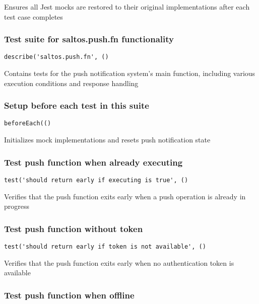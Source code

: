 \documentclass[a4paper]{article}
\begin{document}
Ensures all Jest mocks are restored to their original implementations
after each test case completes

\hypertarget{toc681}{}
\subsubsection{Test suite for saltos.push.fn functionality}

\begin{lstlisting}
describe('saltos.push.fn', ()
\end{lstlisting}

Contains tests for the push notification system's main function,
including various execution conditions and response handling

\hypertarget{toc682}{}
\subsubsection{Setup before each test in this suite}

\begin{lstlisting}
beforeEach(()
\end{lstlisting}

Initializes mock implementations and resets push notification state

\hypertarget{toc683}{}
\subsubsection{Test push function when already executing}

\begin{lstlisting}
test('should return early if executing is true', ()
\end{lstlisting}

Verifies that the push function exits early when a push operation
is already in progress

\hypertarget{toc684}{}
\subsubsection{Test push function without token}

\begin{lstlisting}
test('should return early if token is not available', ()
\end{lstlisting}

Verifies that the push function exits early when no authentication
token is available

\hypertarget{toc685}{}
\subsubsection{Test push function when offline}
\end{document}
